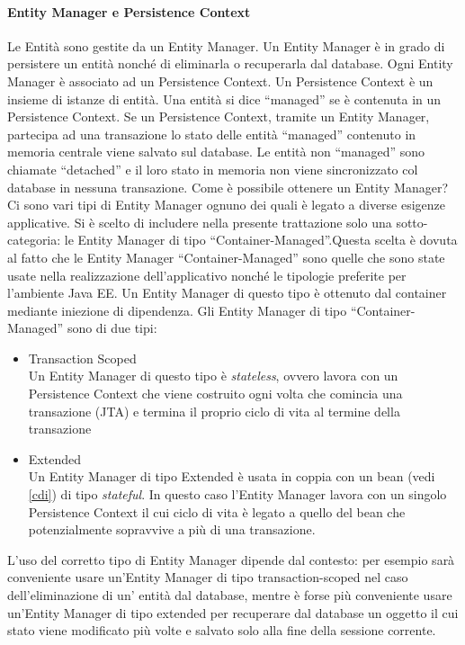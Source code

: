 \paragraph{Entity Manager e Persistence Context}
Le Entità sono gestite da un Entity Manager. Un Entity Manager è in grado di persistere un entità nonché di eliminarla o recuperarla dal database. Ogni Entity Manager è associato ad un Persistence Context. Un Persistence Context è un insieme di
istanze di entità. Una entità si dice ``managed'' se è contenuta in un Persistence Context. Se un Persistence Context, tramite un Entity Manager, partecipa ad una transazione lo stato delle entità ``managed'' contenuto in memoria
centrale viene salvato sul database. Le entità non ``managed'' sono chiamate ``detached'' e il loro stato in memoria non viene sincronizzato col database in nessuna transazione. Come è possibile ottenere un Entity Manager? Ci sono vari tipi
di Entity Manager ognuno dei quali è legato a diverse esigenze applicative. Si è scelto di includere nella presente trattazione solo una sotto-categoria: le Entity Manager di tipo ``Container-Managed''.Questa scelta è dovuta al fatto che
le Entity Manager ``Container-Managed'' sono quelle che sono state usate nella realizzazione dell'applicativo nonché le tipologie preferite per l'ambiente Java EE. Un Entity Manager di questo tipo è ottenuto dal container mediante iniezione
di dipendenza. Gli Entity Manager di tipo ``Container-Managed'' sono di due tipi:

\begin{itemize}
 \item Transaction Scoped\\
 Un Entity Manager di questo tipo è \textsl{stateless}, ovvero lavora con un Persistence Context che viene costruito ogni volta che comincia una transazione (JTA) e termina il proprio ciclo di vita al termine della transazione
 \item Extended\\
  Un Entity Manager di tipo Extended è usata in coppia con un bean (vedi \ref{cdi}) di tipo \textsl{stateful}. In questo caso l'Entity Manager lavora con un singolo Persistence Context il cui ciclo di vita è legato a quello del bean che potenzialmente sopravvive
  a più di una transazione.
\end{itemize}

L'uso del corretto tipo di Entity Manager dipende dal contesto: per esempio sarà conveniente usare un'Entity Manager di tipo transaction-scoped nel caso dell'eliminazione di un' entità dal database, mentre è forse più conveniente usare un'Entity
Manager di tipo extended per recuperare dal database un oggetto il cui stato viene modificato più volte e salvato solo alla fine della sessione corrente.


